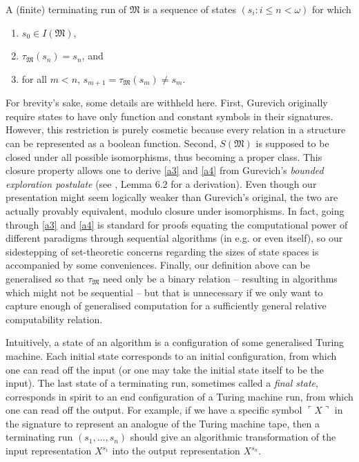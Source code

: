 \documentclass[12pt]{article}
\numberwithin{equation}{section}
\begin{document}
A (finite) terminating run of $\mathfrak{M}$ is a sequence of states $(s_i : i \leq n < \omega)$ for which
\begin{enumerate}[label=(B\arabic*)]
    \item $s_0 \in I(\mathfrak{M})$,
    \item $\tau_{\mathfrak{M}}(s_n) = s_n$, and
    \item for all $m < n$, $s_{m+1} = \tau_{\mathfrak{M}}(s_m) \neq s_m$.
\end{enumerate}

For brevity's sake, some details are withheld here. First, Gurevich originally require states to have only function and constant symbols in their signatures. However, this restriction is purely cosmetic because every relation in a structure can be represented as a boolean function. Second, $S(\mathfrak{M})$ is supposed to be closed under all possible isomorphisms, thus becoming a proper class. This closure property allows one to derive \ref{a3} and \ref{a4} from Gurevich's \emph{bounded exploration postulate} (see \cite{gurevich}, Lemma 6.2 for a derivation). Even though our presentation might seem logically weaker than Gurevich's original, the two are actually provably equivalent, modulo closure under isomorphisms. In fact, going through \ref{a3} and \ref{a4} is standard for proofs equating the computational power of different paradigms through sequential algorithms (in e.g. \cite{dershowitz} or even \cite{gurevich} itself), so our sidestepping of set-theoretic concerns regarding the sizes of state spaces is accompanied by some conveniences. Finally, our definition above can be generalised so that $\tau_{\mathfrak{M}}$ need only be a binary relation -- resulting in algorithms which might not be sequential -- but that is unnecessary if we only want to capture enough of generalised computation for a sufficiently general relative computability relation.

Intuitively, a state of an algorithm is a configuration of some generalised Turing machine. Each initial state corresponds to an initial configuration, from which one can read off the input (or one may take the initial state itself to be the input). The last state of a terminating run, sometimes called a \emph{final state}, corresponds in spirit to an end configuration of a Turing machine run, from which one can read off the output. For example, if we have a specific symbol $\ulcorner X \urcorner$ in the signature to represent an analogue of the Turing machine tape, then a terminating run $(s_1, \dots, s_n)$ should give an algorithmic transformation of the input representation $X^{s_1}$ into the output representation $X^{s_n}$.
\end{document}
